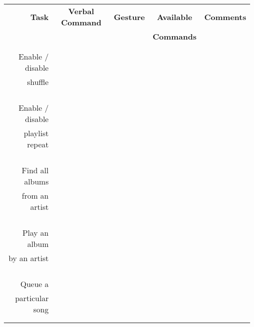 \documentclass[10pt,letterpaper]{article}
\begin{document}
\begin{center}
\begin{tabular}{| r || c | c | c | c |}
\hline
\textbf{Task} & \textbf{Verbal Command} & \textbf{Gesture} & \hspace{0.75cm}\textbf{Available}\hspace{0.75cm} & \hspace{0.75cm}\textbf{Comments}\hspace{0.75cm} \\
& & & \textbf{Commands} & \\
\hline
& & & & \\
& & & & \\
Enable / disable & & & & \\
shuffle & & & & \\
& & & & \\
& & & & \\
\hline
& & & & \\
& & & & \\
Enable / disable & & & & \\
playlist repeat & & & & \\
& & & & \\
& & & & \\
\hline
& & & & \\
& & & & \\
Find all albums & & & & \\
from an artist & & & & \\
& & & & \\
& & & & \\
\hline
& & & & \\
& & & & \\
Play an album & & & & \\
by an artist & & & & \\
& & & & \\
& & & & \\
\hline
& & & & \\
& & & & \\
Queue a & & & & \\
particular song & & & & \\
& & & & \\
& & & & \\
\hline
\end{tabular}
\end{center}
\end{document}
